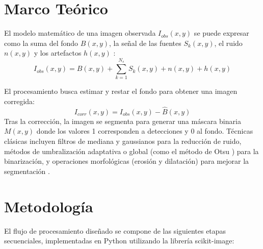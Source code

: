 \documentclass[conference]{IEEEtran}
\begin{document}
\section{Marco Teórico}
El modelo matemático de una imagen observada $I_{obs}(x,y)$ se puede expresar como la suma del fondo $B(x,y)$, la señal de las fuentes $S_k(x,y)$, el ruido $n(x,y)$ y los artefactos $h(x,y)$ \cite{photutils}:
\begin{equation}
I_{obs}(x,y)=B(x,y)+\sum_{k=1}^{N_{s}}S_{k}(x,y)+n(x,y)+h(x,y)
\end{equation}

El procesamiento busca estimar y restar el fondo para obtener una imagen corregida:
\begin{equation}
I_{corr}(x,y)=I_{obs}(x,y)-\hat{B}(x,y)
\end{equation}
Tras la corrección, la imagen se segmenta para generar una máscara binaria $M(x,y)$ donde los valores 1 corresponden a detecciones y 0 al fondo. Técnicas clásicas incluyen filtros de mediana y gaussianos para la reducción de ruido, métodos de umbralización adaptativa o global (como el método de Otsu \cite{otsu}) para la binarización, y operaciones morfológicas (erosión y dilatación) para mejorar la segmentación \cite{scikit}.

\section{Metodología}
El flujo de procesamiento diseñado se compone de las siguientes etapas secuenciales, implementadas en Python utilizando la librería scikit-image:
\end{document}
